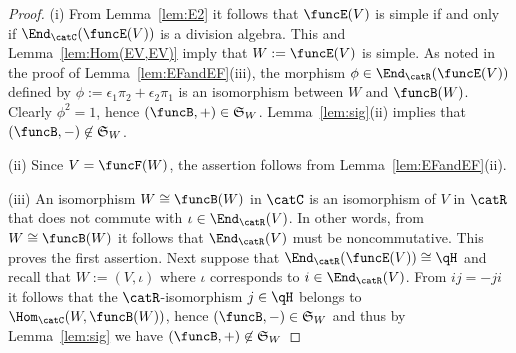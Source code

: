 \documentclass[12pt]{amsart}
\begin{document}
\begin{proof}
(i) From Lemma~\ref{lem:E2} it follows that $\funcE(V)$ is simple if and only if $\End_\catC(\funcE(V))$ is a division algebra. This and Lemma~\ref{lem:Hom(EV,EV)} imply that $W:=\funcE(V)$ is simple. %
As noted in the proof of
Lemma~\ref{lem:EFandEF}(iii), the morphism $\phi\in\End_\catR(\funcE(V))$ defined by  $\phi:=\epsilon_1\pi_2+\epsilon_2\pi_1$ is an isomorphism between $W$ and $\funcB(W)$.  Clearly 
 $\phi^2=1$, hence  $(\funcB,+)\in\mathfrak S_W$.  Lemma~\ref{lem:sig}(ii) implies that $(\funcB,-)\not\in \mathfrak S_W$.

(ii) Since $V=\funcF(W)$, the assertion follows from Lemma~\ref{lem:EFandEF}(ii). 

(iii) An isomorphism $W\cong \funcB(W)$ in $\catC$ is an isomorphism of $V$ in $\catR$ that does not commute with $\iota\in\End_\catR(V)$. In other words, from
$W\cong \funcB(W)$ it follows that
$\End_\catR(V)$ must be noncommutative. This proves the first assertion. 
Next suppose that $\End_\catR(\funcE(V))\cong \qH$ and recall that $W:=(V,\iota)$ where $\iota$ corresponds to $i\in\End_\catR(V)$. From $ij=-ji$ it follows that  the $\catR$-isomorphism $j\in\qH$ belongs to $\Hom_\catC(W,\funcB(W))$, hence $(\funcB,-)\in \mathfrak S_W$ and thus by Lemma~\ref{lem:sig} we have $(\funcB,+)\not\in\mathfrak S_W$
\end{proof}



\end{document}
